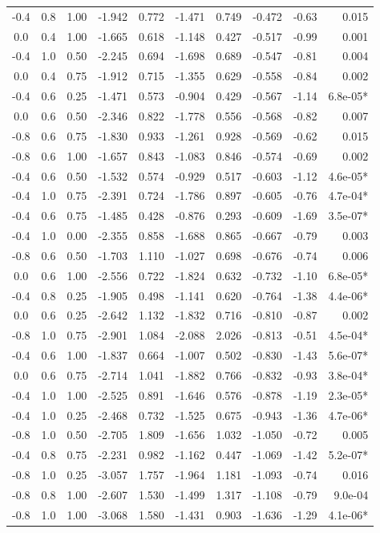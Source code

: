 \begin{longtable}{ccc|rr|rr|r|r|r}
  -0.4 & 0.8 & 1.00 & -1.942 & 0.772 & -1.471 & 0.749 & -0.472 & -0.63 & 0.015 \\
  0.0 & 0.4 & 1.00 & -1.665 & 0.618 & -1.148 & 0.427 & -0.517 & -0.99 & 0.001 \\
  -0.4 & 1.0 & 0.50 & -2.245 & 0.694 & -1.698 & 0.689 & -0.547 & -0.81 & 0.004 \\
  0.0 & 0.4 & 0.75 & -1.912 & 0.715 & -1.355 & 0.629 & -0.558 & -0.84 & 0.002 \\
  -0.4 & 0.6 & 0.25 & -1.471 & 0.573 & -0.904 & 0.429 & -0.567 & -1.14 & 6.8e-05* \\
  0.0 & 0.6 & 0.50 & -2.346 & 0.822 & -1.778 & 0.556 & -0.568 & -0.82 & 0.007 \\
  -0.8 & 0.6 & 0.75 & -1.830 & 0.933 & -1.261 & 0.928 & -0.569 & -0.62 & 0.015 \\
  -0.8 & 0.6 & 1.00 & -1.657 & 0.843 & -1.083 & 0.846 & -0.574 & -0.69 & 0.002 \\
  -0.4 & 0.6 & 0.50 & -1.532 & 0.574 & -0.929 & 0.517 & -0.603 & -1.12 & 4.6e-05* \\
  -0.4 & 1.0 & 0.75 & -2.391 & 0.724 & -1.786 & 0.897 & -0.605 & -0.76 & 4.7e-04* \\
  -0.4 & 0.6 & 0.75 & -1.485 & 0.428 & -0.876 & 0.293 & -0.609 & -1.69 & 3.5e-07* \\
  -0.4 & 1.0 & 0.00 & -2.355 & 0.858 & -1.688 & 0.865 & -0.667 & -0.79 & 0.003 \\
  -0.8 & 0.6 & 0.50 & -1.703 & 1.110 & -1.027 & 0.698 & -0.676 & -0.74 & 0.006 \\
  0.0 & 0.6 & 1.00 & -2.556 & 0.722 & -1.824 & 0.632 & -0.732 & -1.10 & 6.8e-05* \\
  -0.4 & 0.8 & 0.25 & -1.905 & 0.498 & -1.141 & 0.620 & -0.764 & -1.38 & 4.4e-06* \\
  0.0 & 0.6 & 0.25 & -2.642 & 1.132 & -1.832 & 0.716 & -0.810 & -0.87 & 0.002 \\
  -0.8 & 1.0 & 0.75 & -2.901 & 1.084 & -2.088 & 2.026 & -0.813 & -0.51 & 4.5e-04* \\
  -0.4 & 0.6 & 1.00 & -1.837 & 0.664 & -1.007 & 0.502 & -0.830 & -1.43 & 5.6e-07* \\
  0.0 & 0.6 & 0.75 & -2.714 & 1.041 & -1.882 & 0.766 & -0.832 & -0.93 & 3.8e-04* \\
  -0.4 & 1.0 & 1.00 & -2.525 & 0.891 & -1.646 & 0.576 & -0.878 & -1.19 & 2.3e-05* \\
  -0.4 & 1.0 & 0.25 & -2.468 & 0.732 & -1.525 & 0.675 & -0.943 & -1.36 & 4.7e-06* \\
  -0.8 & 1.0 & 0.50 & -2.705 & 1.809 & -1.656 & 1.032 & -1.050 & -0.72 & 0.005 \\
  -0.4 & 0.8 & 0.75 & -2.231 & 0.982 & -1.162 & 0.447 & -1.069 & -1.42 & 5.2e-07* \\
  -0.8 & 1.0 & 0.25 & -3.057 & 1.757 & -1.964 & 1.181 & -1.093 & -0.74 & 0.016 \\
  -0.8 & 0.8 & 1.00 & -2.607 & 1.530 & -1.499 & 1.317 & -1.108 & -0.79 & 9.0e-04 \\
  -0.8 & 1.0 & 1.00 & -3.068 & 1.580 & -1.431 & 0.903 & -1.636 & -1.29 & 4.1e-06* \\
\end{longtable}